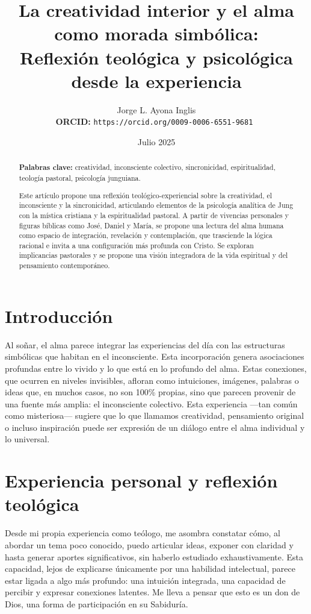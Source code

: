 \documentclass[12pt]{article}
\title{La creatividad interior y el alma como morada simbólica: \\ Reflexión teológica y psicológica desde la experiencia}
\author{Jorge L. Ayona Inglis \\
	\textbf{ORCID:} \texttt{https://orcid.org/0009-0006-6551-9681 }}
\date{Julio 2025}
\begin{document}
\maketitle

\begin{abstract}
\textbf{Palabras clave:} creatividad, inconsciente colectivo, sincronicidad, espiritualidad, teología pastoral, psicología junguiana.

Este artículo propone una reflexión teológico-experiencial sobre la creatividad, el inconsciente y la sincronicidad, articulando elementos de la psicología analítica de Jung con la mística cristiana y la espiritualidad pastoral. A partir de vivencias personales y figuras bíblicas como José, Daniel y María, se propone una lectura del alma humana como espacio de integración, revelación y contemplación, que trasciende la lógica racional e invita a una configuración más profunda con Cristo. Se exploran implicancias pastorales y se propone una visión integradora de la vida espiritual y del pensamiento contemporáneo.
\end{abstract}

\section*{Introducción}

Al soñar, el alma parece integrar las experiencias del día con las estructuras simbólicas que habitan en el inconsciente. Esta incorporación genera asociaciones profundas entre lo vivido y lo que está en lo profundo del alma. Estas conexiones, que ocurren en niveles invisibles, afloran como intuiciones, imágenes, palabras o ideas que, en muchos casos, no son 100\% propias, sino que parecen provenir de una fuente más amplia: el inconsciente colectivo. Esta experiencia —tan común como misteriosa— sugiere que lo que llamamos creatividad, pensamiento original o incluso inspiración puede ser expresión de un diálogo entre el alma individual y lo universal.

\section*{Experiencia personal y reflexión teológica}

Desde mi propia experiencia como teólogo, me asombra constatar cómo, al abordar un tema poco conocido, puedo articular ideas, exponer con claridad y hasta generar aportes significativos, sin haberlo estudiado exhaustivamente. Esta capacidad, lejos de explicarse únicamente por una habilidad intelectual, parece estar ligada a algo más profundo: una intuición integrada, una capacidad de percibir y expresar conexiones latentes. Me lleva a pensar que esto es un don de Dios, una forma de participación en su Sabiduría.
\end{document}

